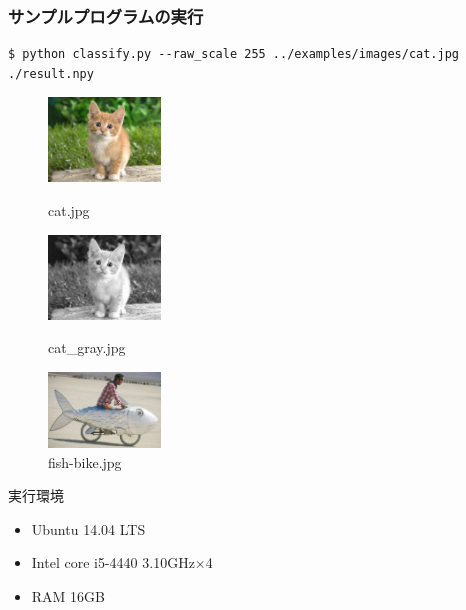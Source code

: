 \documentclass[dvipdfmx,11pt,notheorems]{beamer}
\theoremstyle{definition}
\begin{document}
\begin{frame}[fragile]\frametitle{サンプルプログラムの実行}
 \begin{lstlisting}[basicstyle=\ttfamily\footnotesize, frame=single]
$ python classify.py --raw_scale 255 ../examples/images/cat.jpg ./result.npy
\end{lstlisting}

\begin{figure}[t]
 \begin{minipage}{0.3\hsize}
  \centering
  \includegraphics[width=30mm]{./figure/cat.eps}
  \caption{cat.jpg}
  \label{sample1}
 \end{minipage}
 \begin{minipage}{0.3\hsize}
  \centering
  \includegraphics[width=30mm]{./figure/cat_gray.eps}
  \caption{cat\_gray.jpg}
  \label{sample2}
 \end{minipage}
 \begin{minipage}{0.3\hsize}
  \centering
  \includegraphics[width=30mm]{./figure/fish-bike.eps}
  \caption{fish-bike.jpg}
  \label{sample3}
 \end{minipage}
\end{figure}
\begin{exampleblock}{実行環境} 
\begin{itemize}
 \item Ubuntu 14.04 LTS
 \item Intel core i5-4440 3.10GHz$\times$4
 \item RAM 16GB
\end{itemize}
\end{exampleblock}
\end{frame}
\end{document}
